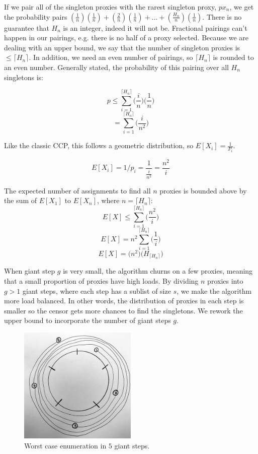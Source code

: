 If we pair all of the singleton proxies with the rarest singleton proxy, $px_n$, we get the probability pairs $(\frac{1}{n})(\frac{1}{n}) + (\frac{2}{n})(\frac{1}{n}) + ... + (\frac{H_n}{n})(\frac{1}{n})$. There is no guarantee that $H_n$ is an integer, indeed it will not be. Fractional pairings can't happen in our pairings, e.g. there is no half of a proxy selected. Because we are dealing with an upper bound, we say that the number of singleton proxies is $\leq \lceil{H_n}\rceil$. In addition, we need an even number of pairings, so $\lceil{H_n}\rceil$ is rounded to an even number. Generally stated, the probability of this pairing over all $H_n$ singletons is:

$$p \leq \sum_{i=1}^{\lceil{H_n}\rceil} \bigg(\frac{i}{n}\bigg) \bigg(\frac{1}{n}\bigg)$$
$$= \sum_{i=1}^{\lceil{H_n}\rceil} \bigg(\frac{i}{n^2}\bigg)$$

Like the classic CCP, this follows a geometric distribution, so $E[X_i] =\frac{1}{P_i}$. 

$$E[X_i] = 1/p_i = \frac{1}{\frac{i}{n^2}} = \frac{n^2}{i}$$

The expected number of assignments to find all $n$ proxies is bounded above by the sum of $E[X_1]$ to $E[X_n]$, where $n=\lceil{H_n}\rceil$:\\

$$E[X] \leq \sum_{i=1}^{\lceil{H_n}\rceil} \bigg(\frac{n^2}{i}\bigg)$$
$$E[X] = n^2 \sum_{i=1}^{\lceil{H_n}\rceil} \bigg(\frac{1}{i}\bigg)$$
$$E[X] = \bigg(n^2\bigg) \bigg(H_{\lceil{H_n}\rceil}\bigg)$$

When giant step $g$ is very small, the algorithm churns on a few proxies, meaning that a small proportion of proxies have high loads. By dividing $n$ proxies into $g>1$ giant steps, where each step has a sublist of size $s$, we make the algorithm more load balanced. In other words, the distribution of proxies in each step is smaller so the censor gets more chances to find the singletons.  We rework the upper bound to incorporate the number of giant steps $g$.

\begin{figure}[h!]
\centering
     \includegraphics[width=0.5\textwidth]{fig/giant_step_upper_bound.png}
    \caption{Worst case enumeration in $5$ giant steps.}

    \label{fig:ubgs}
\end{figure}


